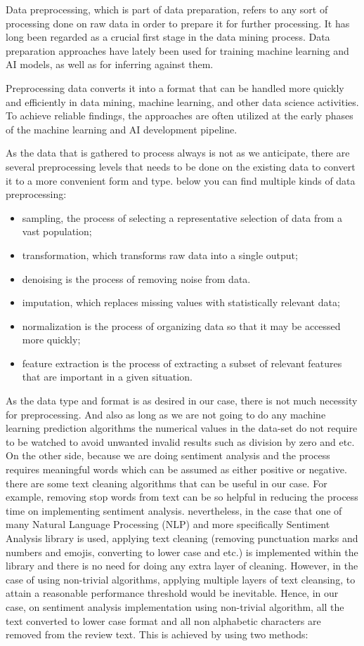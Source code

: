 Data preprocessing, which is part of data preparation, refers to any sort of processing done on raw data in order to prepare it for further processing. It has long been regarded as a crucial first stage in the data mining process. Data preparation approaches have lately been used for training machine learning and AI models, as well as for inferring against them.

Preprocessing data converts it into a format that can be handled more quickly and efficiently in data mining, machine learning, and other data science activities. To achieve reliable findings, the approaches are often utilized at the early phases of the machine learning and AI development pipeline.

As the data that is gathered to process always is not as we anticipate, there are several preprocessing levels that needs to be done on the existing data to convert it to a more convenient form and type. below you can find multiple kinds of data preprocessing:
\begin{itemize}
    \item sampling, the process of selecting a representative selection of data from a vast population;
    \item transformation, which transforms raw data into a single output;
    \item denoising is the process of removing noise from data.
    \item imputation, which replaces missing values with statistically relevant data;
    \item normalization is the process of organizing data so that it may be accessed more quickly;
    \item feature extraction is the process of extracting a subset of relevant features that are important in a given situation.
\end{itemize}

As the data type and format is as desired in our case, there is not much necessity for preprocessing. And also as long as we are not going to do any machine learning prediction algorithms the numerical values in the data-set do not require to be watched to avoid unwanted invalid results such as division by zero and etc. On the other side, because we are doing sentiment analysis and the process requires meaningful words which can be assumed as either positive or negative. there are some text cleaning algorithms that can be useful in our case. For example, removing stop words from text can be so helpful in reducing the process time on implementing sentiment analysis. nevertheless, in the case that one of many Natural Language Processing (NLP) and more specifically Sentiment Analysis library is used, applying text cleaning (removing punctuation marks and numbers and emojis, converting to lower case and etc.) is implemented within the library and there is no need for doing any extra layer of cleaning. However, in the case of using non-trivial algorithms, applying multiple layers of text cleansing, to attain a reasonable performance threshold would be inevitable. Hence, in our case, on sentiment analysis implementation using non-trivial algorithm, all the text converted to lower case format and all non alphabetic characters are removed from the review text. This is achieved by using two methods:
